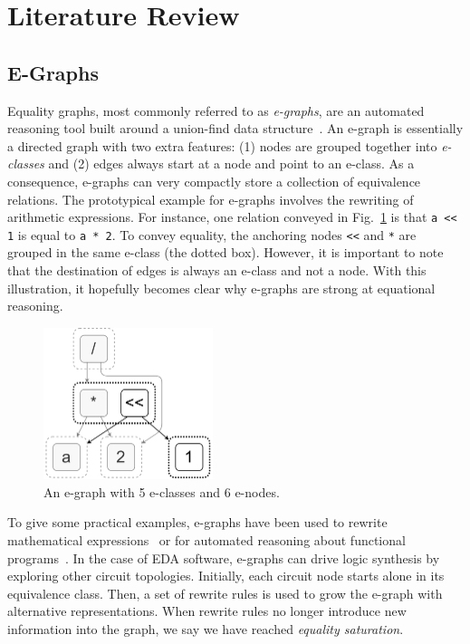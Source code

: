 \documentclass[10pt,letterpaper]{article}
\begin{document}
\section{Literature Review}\label{sec:background}

\subsection{E-Graphs}\label{sec:background:egraph}

Equality graphs, most commonly referred to as \textit{e-graphs}, are an
automated reasoning tool built around a union-find data
structure~\cite{eggpaper}. An e-graph is essentially a directed graph with two
extra features: (1) nodes are grouped together into \textit{e-classes} and (2)
edges always start at a node and point to an e-class. As a consequence,
e-graphs can very compactly store a collection of equivalence relations. The
prototypical example for e-graphs involves the rewriting of arithmetic
expressions. For instance, one relation conveyed in Fig.~\ref{fig:egraph} is
that \texttt{a << 1} is equal to \texttt{a * 2}. To convey equality, the
anchoring nodes \texttt{<<} and \texttt{*} are grouped in the same e-class (the
dotted box). However, it is important to note that the destination of edges is
always an e-class and not a node. With this illustration, it hopefully becomes
clear why e-graphs are strong at equational reasoning.

\begin{figure}
    \centering
    \includegraphics[width=0.44\textwidth]{img/egraph.png}
    \caption{An e-graph with 5 e-classes and 6 e-nodes.}\label{fig:egraph}
\end{figure}

To give some practical examples, e-graphs have been used to rewrite
mathematical expressions~\cite{egraphmath} or for automated reasoning about
functional programs~\cite{cclemma}. In the case of EDA software, e-graphs can
drive logic synthesis by exploring other circuit topologies. Initially, each
circuit node starts alone in its equivalence class. Then, a set of rewrite
rules is used to grow the e-graph with alternative representations. When
rewrite rules no longer introduce new information into the graph, we say we
have reached \textit{equality saturation}.
\end{document}
